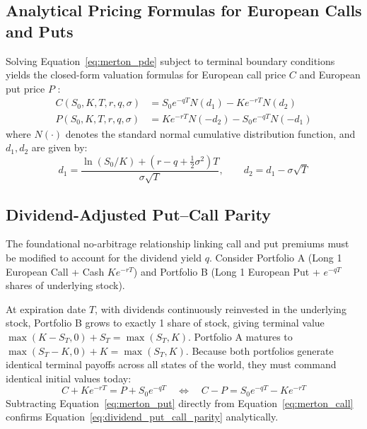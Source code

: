 \subsection{Analytical Pricing Formulas for European Calls and Puts}

Solving Equation~\eqref{eq:merton_pde} subject to terminal boundary conditions yields the closed-form valuation formulas for European call price $C$ and European put price $P$ \citep{hull2018options}:
\begin{align}
    C(S_0, K, T, r, q, \sigma) &= S_0 e^{-qT} N(d_1) - K e^{-rT} N(d_2) \label{eq:merton_call} \\
    P(S_0, K, T, r, q, \sigma) &= K e^{-rT} N(-d_2) - S_0 e^{-qT} N(-d_1) \label{eq:merton_put}
\end{align}
where $N(\cdot)$ denotes the standard normal cumulative distribution function, and $d_1, d_2$ are given by:
\begin{equation}
    d_1 = \frac{\ln(S_0 / K) + \left( r - q + \frac{1}{2}\sigma^2 \right) T}{\sigma \sqrt{T}}, \qquad d_2 = d_1 - \sigma \sqrt{T}
    \label{eq:d1_d2_merton}
\end{equation}

\subsection{Dividend-Adjusted Put--Call Parity}

The foundational no-arbitrage relationship linking call and put premiums must be modified to account for the dividend yield $q$. Consider Portfolio A (Long 1 European Call + Cash $K e^{-rT}$) and Portfolio B (Long 1 European Put + $e^{-qT}$ shares of underlying stock).

At expiration date $T$, with dividends continuously reinvested in the underlying stock, Portfolio B grows to exactly 1 share of stock, giving terminal value $\max(K - S_T, 0) + S_T = \max(S_T, K)$. Portfolio A matures to $\max(S_T - K, 0) + K = \max(S_T, K)$. Because both portfolios generate identical terminal payoffs across all states of the world, they must command identical initial values today:
\begin{equation}
    C + K e^{-rT} = P + S_0 e^{-qT} \quad \iff \quad C - P = S_0 e^{-qT} - K e^{-rT}
    \label{eq:dividend_put_call_parity}
\end{equation}
Subtracting Equation~\eqref{eq:merton_put} directly from Equation~\eqref{eq:merton_call} confirms Equation~\eqref{eq:dividend_put_call_parity} analytically.

\clearpage
